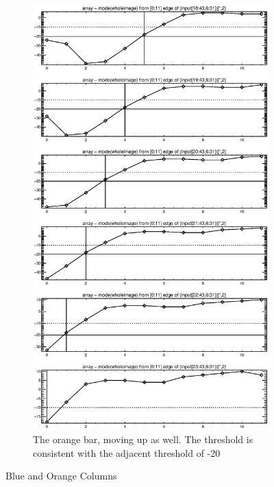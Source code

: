 \documentclass[10pt]{article}
\begin{document}
\begin{figure}[!h]
    \hspace{1.0in}
    \begin{subfigure}[b]{.4\linewidth}
        \centering
        \includegraphics[width=1.4\textwidth]{plots_tables_images/botleft3.eps} 
        \caption{The orange bar, moving up as well. The threshold is consistent with the adjacent threshold of -20}
    \end{subfigure}
    \caption{Blue and Orange Columns}
    \label{secondone}
\end{figure}
\end{document}
